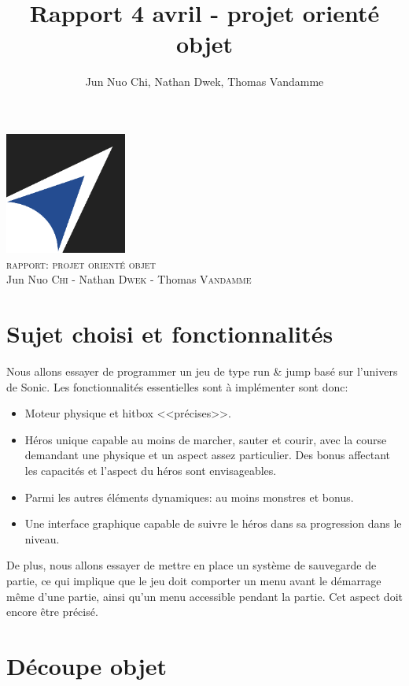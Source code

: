 \documentclass[a4paper, 12pt]{article}
\title{Rapport 4 avril - projet orienté objet}
\author{Jun Nuo Chi, Nathan Dwek, Thomas Vandamme}
\begin{document}
\begin{center}
  \includegraphics[width=0.3\textwidth]{EPB.jpg}~\\[.5cm]

\textsc{\Large rapport: projet orienté objet}\\
Jun Nuo \textsc{Chi} - Nathan \textsc{Dwek} - Thomas \textsc{Vandamme}
\end{center}

\section{Sujet choisi et fonctionnalités}

Nous allons essayer de programmer un jeu de type run \& jump basé sur l'univers de Sonic. Les fonctionnalités essentielles sont à implémenter sont donc:
\begin{itemize}

\item Moteur physique et hitbox <<précises>>.
\item Héros unique capable au moins de marcher, sauter et courir, avec la course demandant une physique et un aspect assez particulier. Des bonus affectant les capacités et l'aspect du héros sont envisageables.
\item Parmi les autres éléments dynamiques: au moins monstres et bonus.
\item Une interface graphique capable de suivre le héros dans sa progression dans le niveau.

\end{itemize}

De plus, nous allons essayer de mettre en place un système de sauvegarde de partie, ce qui implique que le jeu doit comporter un menu avant le démarrage même d'une partie, ainsi qu'un menu accessible pendant la partie. Cet aspect doit encore être précisé.

\section{Découpe objet}
\end{document}
